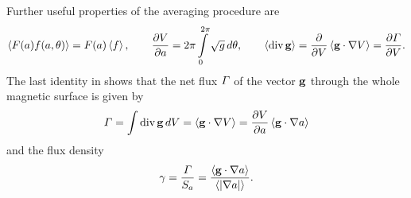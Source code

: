 Further useful properties of the averaging procedure are
\begin{equation}\label{avdiv}
\left<F(a)f(a,\theta)\right>=F(a)\left<f\right>
,\qquad
\displaystyle{\partial V\over\partial a}=2\pi\int\limits_{0}^{2\pi}\sqrt{g}\,d\theta
,\qquad
\left<\mbox{div}\,{\bf g}\right>
=\displaystyle{\partial \over\partial V}\left<{\bf g}\cdot\nabla V\right>
=\displaystyle{\partial \mit\Gamma\over\partial V}
.\end{equation}
The last identity in  shows that the net flux $\mit\Gamma$
of the vector ${\bf g}$ through the whole magnetic surface is given by 
\begin{equation}
{\mit\Gamma}
=\int\mbox{div}\,{\bf g}\,dV
=\left<{{\bf g}}\cdot\nabla V\right>
=\displaystyle{\partial V\over\partial a}\left<{{\bf g}}\cdot\nabla a\right>
\end{equation}
and the flux density
\begin{equation}
\gamma
=\frac{{\mit\Gamma}}{S_a}
=\frac{\av{{{\bf g}}\.\na a}}{\av{|\na a|}}
.\end{equation}


